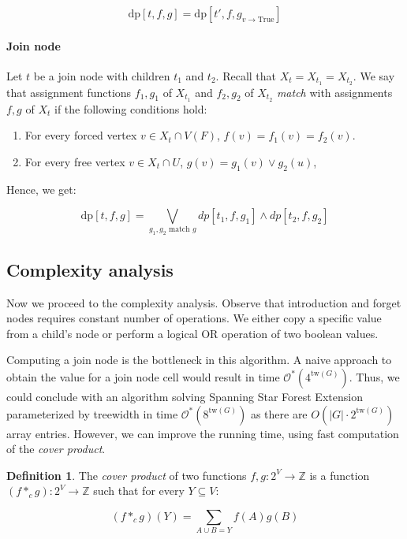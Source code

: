 \documentclass[en]{pracamgr}
\theoremstyle{definition}
\newtheorem{definition}{Definition}
\newcommand{\ssfep}{{\sc Spanning Star Forest Extension}}
\newcommand{\dpt}[1]{\textrm{dp}[#1]}
\newcommand{\true}{\textrm{True}}
\newcommand{\tw}{\textrm{tw}}
\begin{document}
\begin{equation*}
	\dpt{t,f,g} = \dpt{t',f,g_{v \rightarrow \true}}
\end{equation*}

\paragraph{Join node} Let $t$ be a join node with children $t_1$ and $t_2$. Recall that $X_t=X_{t_1}=X_{t_2}$. We say that assignment functions $f_1,g_1$ of $X_{t_1}$ and $f_2,g_2$ of $X_{t_2}$ \textit{match} with assignments $f,g$ of $X_t$ if the following conditions hold:

\begin{enumerate}
	\item For every forced vertex $v \in X_t \cap V(F)$, $f(v)=f_1(v)=f_2(v)$.
	\item For every free vertex $v \in X_t \cap U$, $g(v)=g_1(v) \lor g_2(u)$, 
\end{enumerate}
Hence, we get:

\begin{equation*}
	\dpt{t,f,g} =
		\bigvee\limits_{g_1,g_2 \text{ match $g$}} dp[t_1,f,g_1] \land dp[t_2,f,g_2]
\end{equation*}

\subsection{Complexity analysis}

Now we proceed to the complexity analysis. Observe that introduction and forget nodes requires constant number of operations. We either copy a specific value from a child's node or perform a logical OR operation of two boolean values. 

Computing a join node is the bottleneck in this algorithm. A naive approach to obtain the value for a join node cell would result in time $\mathcal{O}^*(4^{\tw(G)})$. Thus, we could conclude with an algorithm solving \ssfep{} parameterized by treewidth in time $\mathcal{O}^*(8^{\tw(G)})$ as there are $O(|G| \cdot 2^{\tw(G)})$ array entries. However, we can improve the running time, using fast computation of the \textit{cover product}.

\begin{definition}
	The \textit{cover product} of two functions $f,g:2^V \rightarrow \mathbb{Z}$ is a function $(f *_c g):2^V \rightarrow \mathbb{Z}$ such that for every $Y \subseteq V$:
	
	\begin{equation*}
		(f *_c g)(Y) = \sum\limits_{ A \cup B = Y} f(A)g(B)
	\end{equation*}
\end{definition}
\end{document}

